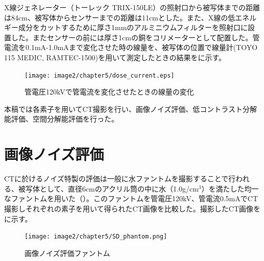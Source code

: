 X線ジェネレーター（トーレック TRIX-150LE）の照射口から被写体までの距離は84cm、被写体からセンサーまでの距離は11cmとした。また、X線の低エネルギー成分をカットするために厚さ1mmのアルミニウムフィルターを照射口に設置した。またセンサーの前には厚さ1cmの銅をコリメーターとして配置した。管電流を0.1mA-1.0mAまで変化させた時の線量を、被写体の位置で線量計(TOYO 115 MEDIC, RAMTEC-1500)を用いて測定したときの結果をに示す。

\begin{figure}[H]
 \begin{center}
 \texttt{[image: image2/chapter5/dose\_current.eps]}
 \end{center}
 \caption{管電圧120kVで管電流を変化させたときの線量の変化}
 \label{fig:dose_current}
\end{figure}


本稿では各素子を用いてCT撮影を行い、画像ノイズ評価、低コントラスト分解能評価、空間分解能評価を行った。

\section{画像ノイズ評価}
CTに於けるノイズ特製の評価は一般に水ファントムを撮影することで行われる、被写体として、直径6cmのアクリル筒の中に水（1.0g/cm$^3$）を満たした均一なファントムを用いた（）。このファントムを管電圧120kV、管電流0.5mAでCT撮影しそれぞれの素子を用いて得られたCT画像を比較した。撮影したCT画像をに示す。

\begin{figure}[H]
 \begin{center}
 \texttt{[image: image2/chapter5/SD\_phantom.png]} 
 \end{center}
 \caption{画像ノイズ評価ファントム}
 \label{fig:SD_phantom}
\end{figure}


